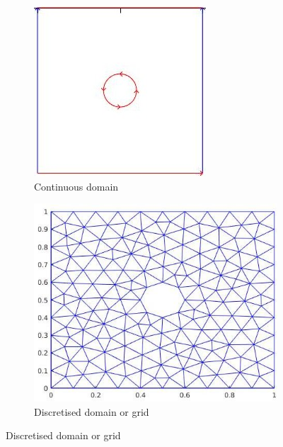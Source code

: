 \documentclass[a4paper,12pt]{book}
\begin{document}
\begin{figure}[H]
\begin{subfigure}{.5\textwidth}
\centering
  \includegraphics[width=\linewidth]{domain.jpg}
  \caption{Continuous domain}
  \label{fig:Domain}
\end{subfigure}
\begin{subfigure}{.5\textwidth}	
\centering
  \includegraphics[width=\linewidth]{grid.jpg}
  \caption{Discretised domain or grid}
  \label{fig:Mesh}
\end{subfigure}
\end{figure}
\end{document}
